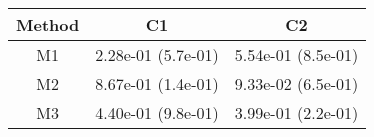 \begin{tabular}{ccc}
\toprule
Method&C1&C2\tabularnewline
\midrule
M1& 2.28e-01 (5.7e-01)& 5.54e-01 (8.5e-01)\tabularnewline
M2& 8.67e-01 (1.4e-01)& 9.33e-02 (6.5e-01)\tabularnewline
M3& 4.40e-01 (9.8e-01)& 3.99e-01 (2.2e-01)\tabularnewline
\bottomrule
\end{tabular}
